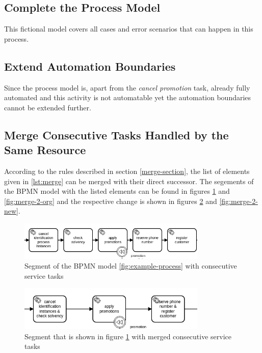 \subsection{Complete the Process Model}
This fictional model covers all cases and error scenarios that can happen in this process.

\subsection{Extend Automation Boundaries}
Since the process model is, apart from the \textit{cancel promotion} task, already fully automated and this activity is not automatable yet the automation boundaries cannot be extended further. 

\subsection{Merge Consecutive Tasks Handled by the Same Resource}
According to the rules described in section \ref{merge-section}, the list of elements given in \ref{lst:merge} can be merged with their direct successor. The segements of the BPMN model with the listed elements can be found in figures \ref{fig:merge-1-org} and \ref{fig:merge-2-org} and the respective change is shown in figures \ref{fig:merge-1-new} and \ref{fig:merge-2-new}. 
\begin{figure}[H]
	\centering
	\includegraphics[width=0.8\textwidth]{graphics/case-study-merge-org-1}
	\caption{Segment of the BPMN model \ref{fig:example-process} with consecutive service tasks}
	\label{fig:merge-1-org}
\end{figure}

\begin{figure}[H]
	\centering
	\includegraphics[width=0.8\textwidth]{graphics/case-study-merge-new-1}
	\caption{Segment that is shown in figure \ref{fig:merge-1-org} with merged consecutive service tasks}
	\label{fig:merge-1-new}
\end{figure}

